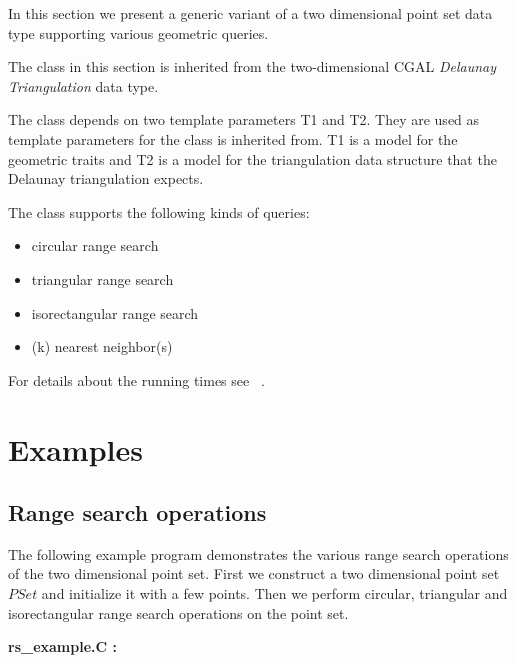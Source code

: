 In this section we present a generic variant of a two dimensional point set
data type supporting various geometric queries.

The  class in this section is inherited
from the two-dimensional CGAL {\em Delaunay Triangulation} data type.

The  class depends on two template parameters T1 and T2.
They are used as template parameters for the 
class  is inherited from. T1 is a model for the
geometric traits and T2 is a model for the triangulation data structure that the Delaunay triangulation
expects.

The  class supports the following kinds of queries:
\begin{itemize}
\item circular range search
\item triangular range search
\item isorectangular range search
\item (k) nearest neighbor(s)
\end{itemize}
For details about the running times see ~\cite{LEDAbook}.

\section{Examples}

\subsection{Range search operations}

The following example program demonstrates the various range search operations
of the two dimensional point set.
First we construct a two dimensional point set $PSet$ and initialize it with a few points.
Then we perform circular, triangular and isorectangular range search operations on the
point set.

\ccHtmlLinksOff

{\bf rs\_example.C :}


\ccHtmlLinksOn

